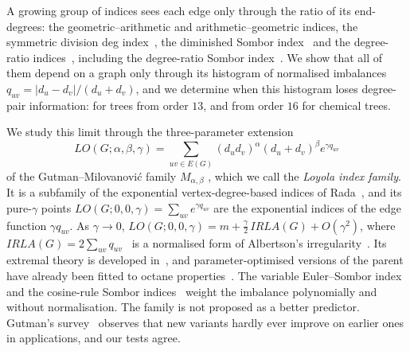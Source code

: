 \documentclass[a5paper, 10pt]{article}
\theoremstyle{plain}
\theoremstyle{remark}
\theoremstyle{definition}
\begin{document}
  A growing group of indices sees each edge only through the ratio of
  its end-degrees: the geometric--arithmetic and arithmetic--geometric
  indices, the symmetric division deg index~\cite{VukicevicGasperov2010},
  the diminished Sombor index~\cite{MovahediGutmanRedzepovicFurtula2026}
  and the degree-ratio
  indices~\cite{NyauliBuragohain2027DRSO, GutmanBuragohainNyauli2026},
  including the degree-ratio Sombor
  index~\cite{GutmanRedzepovicBuragohainNyauli2027, AliGutmanEtAl2027DRSO, ShaoJahanbani2027}.
  We show that all of them depend on a graph only through its histogram
  of normalised imbalances $q_{uv} = |d_u - d_v|/(d_u + d_v)$, and we
  determine when this histogram loses degree-pair information: for trees
  from order $13$, and from order $16$ for chemical trees.

  We study this limit through the three-parameter extension
  \[
  LO(G;\alpha,\beta,\gamma) = \sum_{uv \in E(G)}
  (d_u d_v)^{\alpha}(d_u+d_v)^{\beta} e^{\gamma q_{uv}}
  \]
  of the Gutman--Milovanovi\'c family $M_{\alpha,\beta}$
  \cite{GutmanMilovanovic2020AKCE, MolinaSigarreta2025GM}, which we call
  the \emph{Loyola index family}. It is a subfamily of the exponential
  vertex-degree-based indices of Rada~\cite{Rada2019ExpVDB}, and its
  pure-$\gamma$ points $LO(G;0,0,\gamma) = \sum_{uv} e^{\gamma q_{uv}}$
  are the exponential indices of the edge function $\gamma q_{uv}$. As
  $\gamma \to 0$, $LO(G;0,0,\gamma) = m + \tfrac{\gamma}{2}\,IRLA(G) + O(\gamma^2)$,
  where $IRLA(G) = 2\sum_{uv} q_{uv}$~\cite{RetiSharafdini2018IRLA} is a
  normalised form of Albertson's irregularity~\cite{Albertson1997, LinZhouWangMiao2022}. Its extremal theory is developed
  in~\cite{CruzMonsalveRada2020, Sigarreta2022ExpVDB, GaoAMC2024, HuMATCH2022},
  and parameter-optimised versions of the parent have already been fitted
  to octane properties~\cite{AliGutmanFurtulaAlbalahiHamza2025}. The
  variable Euler--Sombor index~\cite{GutmanRedzepovicKizilirmakKulli2025EU}
  and the cosine-rule Sombor indices~\cite{NyauliBuragohain2026CoRSO}
  weight the imbalance polynomially and without normalisation. The family
  is not proposed as a better predictor. Gutman's survey~\cite{Gutman2026SomborSurvey}
  observes that new variants hardly ever improve on earlier ones in
  applications, and our tests agree.
\end{document}
